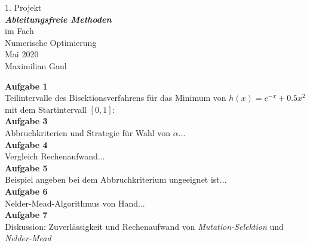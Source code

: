 \documentclass[a4paper, 12pt]{report}
\begin{document}
\begin{center}
    \vspace*{2em}
    \normalsize 1. Projekt\\
    \vspace*{1em}
    \normalsize \textbf{\textit{Ableitungsfreie Methoden}}\\
    \vspace*{4em}
    \normalsize im Fach\\
    \vspace*{1em}
    \large Numerische Optimierung\\
    \vspace*{30em}
    \normalsize Mai 2020\\
    \vspace*{1em}
    \normalsize Maximilian Gaul
\end{center}

\thispagestyle{empty}

\newpage

\textbf{Aufgabe 1}\\
Teilintervalle des Bisektionsverfahrens für das Minimum von $h(x) = e^{-x} + 0.5x^2$ mit dem Startintervall $[0, 1]$:
\\

\textbf{Aufgabe 3}\\
Abbruchkriterien und Strategie für Wahl von $\alpha$...
\\

\textbf{Aufgabe 4}\\
Vergleich Rechenaufwand...
\\

\textbf{Aufgabe 5}\\
Beispiel angeben bei dem Abbruchkriterium ungeeignet ist...
\\

\textbf{Aufgabe 6}\\
Nelder-Mead-Algorithmus von Hand...
\\

\textbf{Aufgabe 7}\\
Diskussion: Zuverlässigkeit und Rechenaufwand von \textit{Mutation-Selektion} und \textit{Nelder-Mead}
\end{document}
